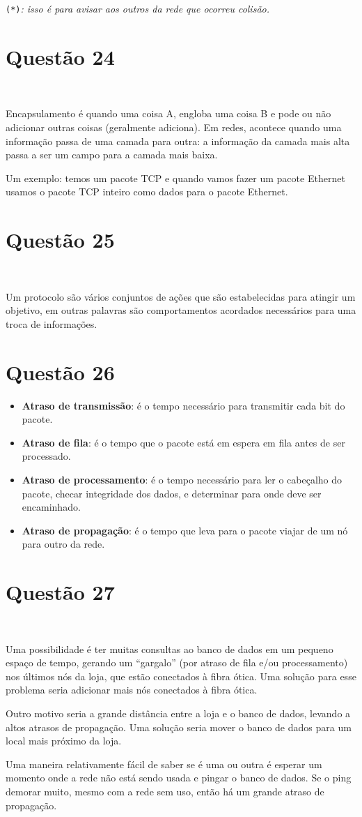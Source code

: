 \documentclass{article}
\begin{document}
\texttt{(*)}\textit{:
    isso é para avisar aos outros da rede que ocorreu colisão.
}

\newpage
\section*{Questão 24}\

Encapsulamento é quando uma coisa A, engloba uma coisa B e pode ou não
adicionar outras coisas (geralmente adiciona). Em redes, acontece quando uma
informação passa de uma camada para outra: a informação da camada mais alta
passa a ser um campo para a camada mais baixa.

Um exemplo: temos um pacote TCP e quando vamos fazer um pacote
Ethernet usamos o pacote TCP inteiro como dados para o pacote Ethernet.

\section*{Questão 25}\

Um protocolo são vários conjuntos de ações que são estabelecidas para atingir
um objetivo, em outras palavras são comportamentos acordados necessários para
uma troca de informações.

\section*{Questão 26}

\begin{itemize}
    \item \textbf{Atraso de transmissão}:
        é o tempo necessário para transmitir cada bit do pacote.
    \item \textbf{Atraso de fila}:
        é o tempo que o pacote está em espera em fila antes de ser processado.
    \item \textbf{Atraso de processamento}:
        é o tempo necessário para ler o cabeçalho do pacote,
        checar integridade dos dados,
        e determinar para onde deve ser encaminhado.
    \item \textbf{Atraso de propagação}:
        é o tempo que leva para o pacote viajar de um nó para outro da rede.
\end{itemize}

\section*{Questão 27}\

Uma possibilidade é ter muitas consultas ao banco de dados
em um pequeno espaço de tempo,
gerando um ``gargalo''
(por atraso de fila e/ou processamento)
nos últimos nós da loja,
que estão conectados à fibra ótica.
Uma solução para esse problema seria adicionar mais nós
conectados à fibra ótica.

Outro motivo seria a grande distância
entre a loja e o banco de dados,
levando a altos atrasos de propagação.
Uma solução seria mover o banco de dados
para um local mais próximo da loja.

Uma maneira relativamente fácil de saber se é uma ou outra
é esperar um momento onde a rede não está sendo usada
e pingar o banco de dados.
Se o ping demorar muito,
mesmo com a rede sem uso,
então há um grande atraso de propagação.
\end{document}
